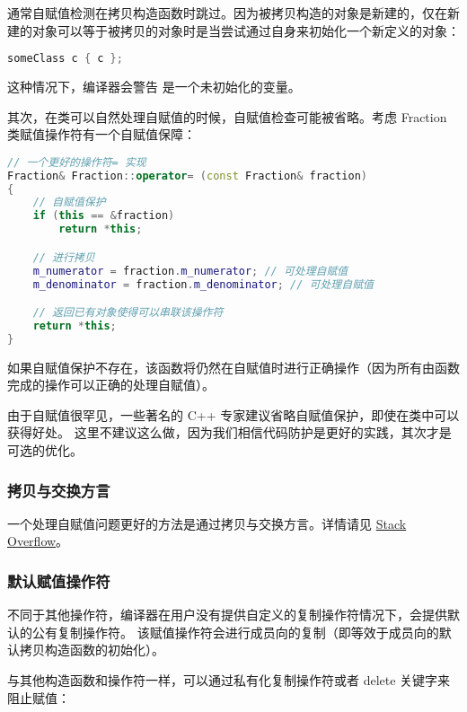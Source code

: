 \documentclass[../../LearnCpp.tex]{subfiles}
\begin{document}
通常自赋值检测在拷贝构造函数时跳过。因为被拷贝构造的对象是新建的，仅在新建的对象可以等于被拷贝的对象时是当尝试通过自身来初始化一个新定义的对象：

\begin{lstlisting}[language=C++]
someClass c { c };
\end{lstlisting}

这种情况下，编译器会警告  是一个未初始化的变量。

其次，在类可以自然处理自赋值的时候，自赋值检查可能被省略。考虑 Fraction 类赋值操作符有一个自赋值保障：

\begin{lstlisting}[language=C++]
// 一个更好的操作符= 实现
Fraction& Fraction::operator= (const Fraction& fraction)
{
    // 自赋值保护
    if (this == &fraction)
        return *this;

    // 进行拷贝
    m_numerator = fraction.m_numerator; // 可处理自赋值
    m_denominator = fraction.m_denominator; // 可处理自赋值

    // 返回已有对象使得可以串联该操作符
    return *this;
}
\end{lstlisting}

如果自赋值保护不存在，该函数将仍然在自赋值时进行正确操作（因为所有由函数完成的操作可以正确的处理自赋值）。

由于自赋值很罕见，一些著名的 C++ 专家建议省略自赋值保护，即使在类中可以获得好处。
这里不建议这么做，因为我们相信代码防护是更好的实践，其次才是可选的优化。

\subsubsection*{拷贝与交换方言}

一个处理自赋值问题更好的方法是通过拷贝与交换方言。详情请见 \href{https://stackoverflow.com/questions/3279543/what-is-the-copy-and-swap-idiom}{Stack Overflow}。

\subsubsection*{默认赋值操作符}

不同于其他操作符，编译器在用户没有提供自定义的复制操作符情况下，会提供默认的公有复制操作符。
该赋值操作符会进行成员向的复制（即等效于成员向的默认拷贝构造函数的初始化）。

与其他构造函数和操作符一样，可以通过私有化复制操作符或者 delete 关键字来阻止赋值：
\end{document}

